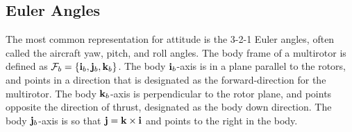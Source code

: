 \subsection{Euler Angles}

The most common representation for attitude is the 3-2-1 Euler angles, often called the aircraft yaw, pitch, and roll angles.  
The body frame of a multirotor is defined as $\mathcal{F}_b = \{\mathbf{i}_b, \mathbf{j}_b, \mathbf{k}_b\}$.  The body $\mathbf{i}_b$-axis is in a plane parallel to the rotors, and points in a direction that is designated as the forward-direction for the multirotor. The body $\mathbf{k}_b$-axis is perpendicular to the rotor plane, and points opposite the direction of thrust, designated as the body down direction.  The body $\mathbf{j}_b$-axis is so that $\mathbf{j}=\mathbf{k}\times\mathbf{i}$ and points to the right in the body.

